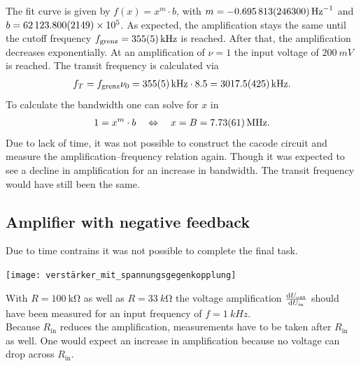 \documentclass[a4paper,10pt]{article}
\newenvironment{Figure}
  {\par\medskip\noindent\minipage{\linewidth}}
  {\endminipage\par\medskip} %
\numberwithin{equation}{section}
\begin{document}
\begin{multicols}{2}
\begin{Figure}
        \end{Figure}
        The fit curve is given by $f\left(x\right)=x^m\cdot b$, with $m=\SI{-0.695813+-0.2463}{Hz^{-1}}$ and $b=\SI{62123.8+-2.149e+05}{}$.
        As expected, the amplification stays the same until the cutoff frequency $f_\text{grenz}=\SI{355+-5}{kHz}$ is reached.
        After that, the amplification decreases exponentially.
        At an amplification of $\nu =1$ the input voltage of $\SI{200}{mV}$ is reached.
        The transit frequency is calculated via
        \begin{align} 
                f_T=f_\text{grenz}\nu _0=\SI{355+-5}{kHz}\cdot 8.5=\SI{3017.5+-42.5}{kHz}
        .\end{align} 
        To calculate the bandwidth one can solve for $x$ in
        \begin{align} 
                1=x^{m}\cdot b\quad \Leftrightarrow \quad x=B=\SI{7.73+-0.61}{MHz}
        .\end{align} 
        Due to lack of time, it was not possible to construct the cacode circuit and measure the amplification--frequency relation again.
        Though it was expected to see a decline in amplification for an increase in bandwidth.
        The transit frequency would have still been the same.

        \subsection{Amplifier with negative feedback}
        Due to time contrains it was not possible to complete the final task.
        \begin{Figure}
                \centering
                \texttt{[image: verstärker\_mit\_spannungsgegenkopplung]}
        \end{Figure}
        With $R=\SI{100}{\kilo\ohm}$ as well as $R=\SI{33}{k\ohm}$ the voltage amplification $\diff[]{U_\text{out}}{U_\text{in}}$ should have been measured for an input frequency of $f=\SI{1}{kHz}$.
        \\\indent Because $R_\text{in}$ reduces the amplification, measurements have to be taken after $R_\text{in}$ as well.
        One would expect an increase in amplification because no voltage can drop across $R_\text{in}$.

\end{multicols}

\clearpage
\listoffigures
\listoftables



\end{document}
